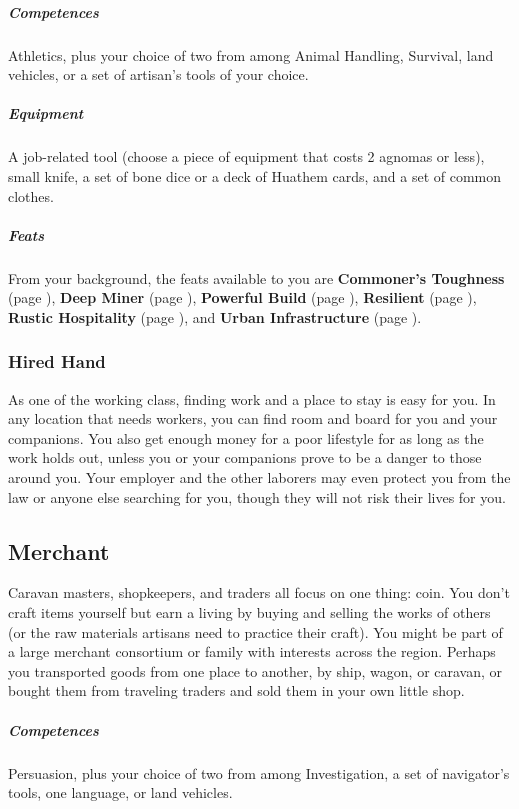     \subparagraph{Competences} Athletics, plus your choice of two from among Animal Handling, Survival, land vehicles, or a set of artisan's tools of your choice.

    \subparagraph{Equipment} A job-related tool (choose a piece of equipment that costs 2 agnomas or less), small knife, a set of bone dice or a deck of Huathem cards, and a set of common clothes.

    \subparagraph{Feats} From your background, the feats available to you are
    \textbf{Commoner's Toughness} (page \pageref{feat::commonerstoughness}),
    \textbf{Deep Miner} (page \pageref{feat::deepminer}),
    \textbf{Powerful Build} (page \pageref{feat::powerfulbuild}),
    \textbf{Resilient} (page \pageref{feat::resilient}),
    \textbf{Rustic Hospitality} (page \pageref{feat::rustichospitality}), and
    \textbf{Urban Infrastructure} (page \pageref{feat::urbaninfrastructure}).

    \subsubsection{Hired Hand}
        As one of the working class, finding work and a place to stay is easy for you.
        In any location that needs workers, you can find room and board for you and your companions.
        You also get enough money for a poor lifestyle for as long as the work holds out, unless you or your companions prove to be a danger to those around you.
        Your employer and the other laborers may even protect you from the law or anyone else searching for you, though they will not risk their lives for you.

\subsection*{Merchant} \label{ssec::merchant}
    Caravan masters, shopkeepers, and traders all focus on one thing: coin.
    You don't craft items yourself but earn a living by buying and selling the works of others (or the raw materials artisans need to practice their craft).
    You might be part of a large merchant consortium or family with interests across the region. Perhaps you transported goods from one place to another, by ship, wagon, or caravan, or bought them from traveling traders and sold them in your own little shop.

    \subparagraph{Competences} Persuasion, plus your choice of two from among Investigation, a set of navigator's tools, one language, or land vehicles.

